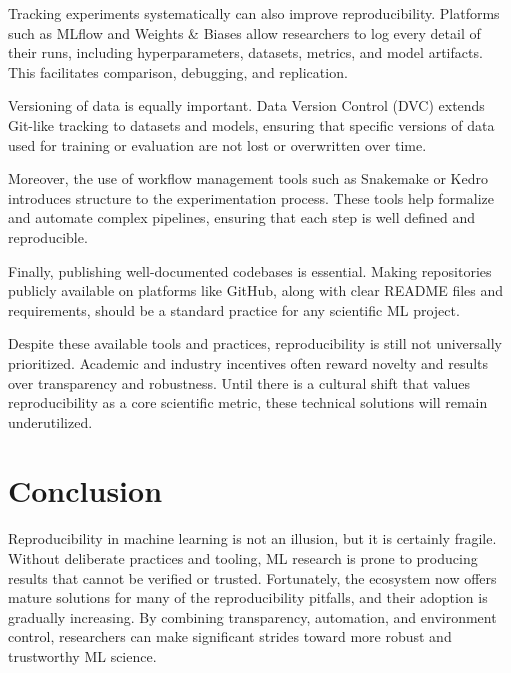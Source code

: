 \documentclass[11pt]{article}
\begin{document}
Tracking experiments systematically can also improve reproducibility. Platforms such as MLflow and Weights \& Biases allow researchers to log every detail of their runs, including hyperparameters, datasets, metrics, and model artifacts. This facilitates comparison, debugging, and replication.

Versioning of data is equally important. Data Version Control (DVC) extends Git-like tracking to datasets and models, ensuring that specific versions of data used for training or evaluation are not lost or overwritten over time.

Moreover, the use of workflow management tools such as Snakemake or Kedro introduces structure to the experimentation process. These tools help formalize and automate complex pipelines, ensuring that each step is well defined and reproducible.

Finally, publishing well-documented codebases is essential. Making repositories publicly available on platforms like GitHub, along with clear README files and requirements, should be a standard practice for any scientific ML project.

Despite these available tools and practices, reproducibility is still not universally prioritized. Academic and industry incentives often reward novelty and results over transparency and robustness. Until there is a cultural shift that values reproducibility as a core scientific metric, these technical solutions will remain underutilized.


\section{Conclusion}
\label{sec:conclusion}
Reproducibility in machine learning is not an illusion, but it is certainly fragile. Without deliberate practices and tooling, ML research is prone to producing results that cannot be verified or trusted. Fortunately, the ecosystem now offers mature solutions for many of the reproducibility pitfalls, and their adoption is gradually increasing. By combining transparency, automation, and environment control, researchers can make significant strides toward more robust and trustworthy ML science.
\end{document}
